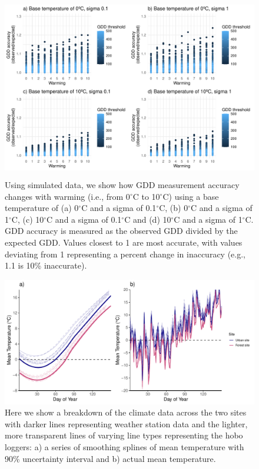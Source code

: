 \documentclass{article}\usepackage[]{graphicx}\usepackage[]{color}
\begin{document}
\begin{figure}[H]
    \centering
    \includegraphics[height=8cm, width=12cm]{..//analyses/figures/gddratio_warming.pdf}
\caption{Using simulated data, we show how GDD measurement accuracy changes with warming (i.e., from 0$^{\circ}$C to 10$^{\circ}$C) using a base temperature of (a) 0$^{\circ}$C and a sigma of 0.1$^{\circ}$C, (b) 0$^{\circ}$C and a sigma of 1$^{\circ}$C, (c) 10$^{\circ}$C and a sigma of 0.1$^{\circ}$C and (d) 10$^{\circ}$C and a sigma of 1$^{\circ}$C. GDD accuracy is measured as the observed GDD divided by the expected GDD. Values closest to 1 are most accurate, with values deviating from 1 representing a percent change in inaccuracy (e.g., 1.1 is 10\% inaccurate). }
\label{fig:warming}
\end{figure}


{\begin{figure} [H]
  \begin{center}
  \includegraphics[width=16cm]{..//analyses/figures/climate_smoothdaily.pdf}
  \caption{Here we show a breakdown of the climate data across the two sites with darker lines representing weather station data and the lighter, more transparent lines of varying line types representing the hobo loggers: a) a series of smoothing splines of mean temperature with 90\% uncertainty interval and b) actual mean temperature.}\label{fig:clim}
  \end{center}
  \end{figure}}
  
\end{document}
